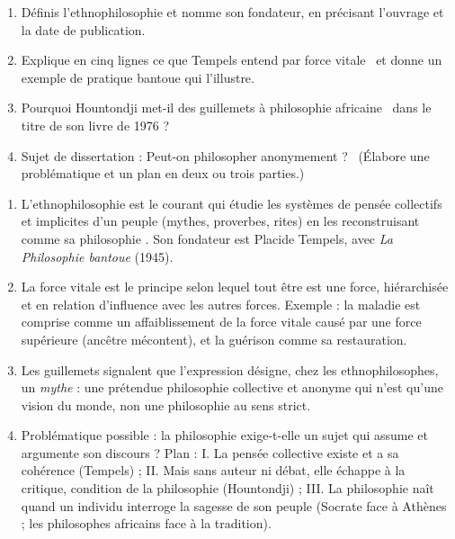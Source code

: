 \documentclass[11pt]{article}
\begin{document}
\begin{exercice}
\begin{enumerate}
\item Définis l'ethnophilosophie et nomme son fondateur, en précisant l'ouvrage et la date de publication.
\item Explique en cinq lignes ce que Tempels entend par \guillemotleft force vitale \guillemotright\ et donne un exemple de pratique bantoue qui l'illustre.
\item Pourquoi Hountondji met-il des guillemets à \guillemotleft philosophie africaine \guillemotright\ dans le titre de son livre de 1976 ?
\item Sujet de dissertation : \guillemotleft Peut-on philosopher anonymement ? \guillemotright\ (Élabore une problématique et un plan en deux ou trois parties.)
\end{enumerate}
\end{exercice}

\begin{corrige}[Exercices]
\begin{enumerate}
\item L'ethnophilosophie est le courant qui étudie les systèmes de pensée collectifs et implicites d'un peuple (mythes, proverbes, rites) en les reconstruisant comme sa \guillemotleft philosophie \guillemotright. Son fondateur est Placide Tempels, avec \emph{La Philosophie bantoue} (1945).
\item La force vitale est le principe selon lequel tout être est une force, hiérarchisée et en relation d'influence avec les autres forces. Exemple : la maladie est comprise comme un affaiblissement de la force vitale causé par une force supérieure (ancêtre mécontent), et la guérison comme sa restauration.
\item Les guillemets signalent que l'expression désigne, chez les ethnophilosophes, un \emph{mythe} : une prétendue philosophie collective et anonyme qui n'est qu'une vision du monde, non une philosophie au sens strict.
\item Problématique possible : la philosophie exige-t-elle un sujet qui assume et argumente son discours ? Plan : I. La pensée collective existe et a sa cohérence (Tempels) ; II. Mais sans auteur ni débat, elle échappe à la critique, condition de la philosophie (Hountondji) ; III. La philosophie naît quand un individu interroge la sagesse de son peuple (Socrate face à Athènes ; les philosophes africains face à la tradition).
\end{enumerate}
\end{corrige}
\end{document}

